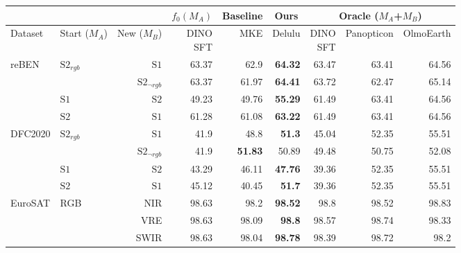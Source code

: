 \begin{tabular}{llr | r | rr | rrr}
\toprule
\multicolumn{3}{c}{} & \multicolumn{1}{c|}{$f_0(M_A)$} & \multicolumn{1}{c|}{Baseline} & \multicolumn{1}{c|}{Ours} & \multicolumn{3}{c}{Oracle ($M_A$+$M_B$)} \\
\midrule
Dataset & \shortstack[c]{Start\\($M_A$)} & \shortstack[c]{New\\($M_B$)} & \shortstack[c]{DINO\\SFT} & MKE & Delulu & \shortstack[c]{DINO\\SFT} & Panopticon & OlmoEarth \\
\midrule
  \multirow{4}{*}{reBEN} & \multirow{2}{*}{$\mathrm{S2}_{rgb}$} & $\mathrm{S1}$ & 63.37 & 62.9 & \textbf{64.32} & 63.47 & 63.41 & 64.56 \\
   &  & $\mathrm{S2}_{\neg rgb}$ & 63.37 & 61.97 & \textbf{64.41} & 63.72 & 62.47 & 65.14 \\
   & $\mathrm{S1}$ & $\mathrm{S2}$ & 49.23 & 49.76 & \textbf{55.29} & 61.49 & 63.41 & 64.56 \\
   & $\mathrm{S2}$ & $\mathrm{S1}$ & 61.28 & 61.08 & \textbf{63.22} & 61.49 & 63.41 & 64.56 \\
  \midrule
  \multirow{4}{*}{DFC2020} & \multirow{2}{*}{$\mathrm{S2}_{rgb}$} & $\mathrm{S1}$ & 41.9 & 48.8 & \textbf{51.3} & 45.04 & 52.35 & 55.51 \\
   &  & $\mathrm{S2}_{\neg rgb}$ & 41.9 & \textbf{51.83} & 50.89 & 49.48 & 50.75 & 52.08 \\
   & $\mathrm{S1}$ & $\mathrm{S2}$ & 43.29 & 46.11 & \textbf{47.76} & 39.36 & 52.35 & 55.51 \\
   & $\mathrm{S2}$ & $\mathrm{S1}$ & 45.12 & 40.45 & \textbf{51.7} & 39.36 & 52.35 & 55.51 \\
  \midrule
  \multirow{3}{*}{EuroSAT} & \multirow{3}{*}{RGB} & NIR & 98.63 & 98.2 & \textbf{98.52} & 98.8 & 98.52 & 98.83 \\
   &  & VRE & 98.63 & 98.09 & \textbf{98.8} & 98.57 & 98.74 & 98.33 \\
   &  & SWIR & 98.63 & 98.04 & \textbf{98.78} & 98.39 & 98.72 & 98.2 \\
\bottomrule
\end{tabular}

